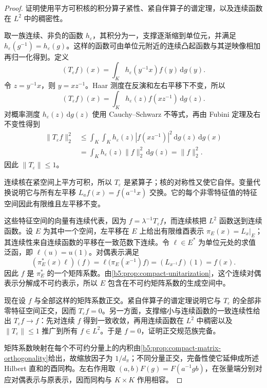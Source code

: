 \begin{proof}
	证明使用平方可积核的积分算子紧性、紧自伴算子的谱定理，以及连续函数在 \(L^2\) 中的稠密性。

	取一族连续、非负的函数 \(h_\varepsilon\)，其积分为一，支撑逐渐缩到单位元，并满足 \(h_\varepsilon(g^{-1})=h_\varepsilon(g)\)。这样的函数可由单位元附近的连续凸起函数与其逆映像相加再归一化得到。定义
	\[
		(T_\varepsilon f)(x)=\int_Kh_\varepsilon(y^{-1}x)f(y)\,\mathrm{d}g(y).
	\]
	令 \(z=y^{-1}x\)，则 \(y=xz^{-1}\)。Haar 测度在反演和左右平移下不变，所以
	\[
		(T_\varepsilon f)(x)=\int_Kh_\varepsilon(z)f(xz^{-1})\,\mathrm{d}g(z).
	\]
	对概率测度 \(h_\varepsilon(z)\,\mathrm{d}g(z)\) 使用 Cauchy--Schwarz 不等式，再由 Fubini 定理及右不变性得到
	\[
		\begin{aligned}
			\|T_\varepsilon f\|_2^2 &\le\int_K\int_Kh_\varepsilon(z)|f(xz^{-1})|^2\,\mathrm{d}g(z)\,\mathrm{d}g(x)\\
			&=\int_Kh_\varepsilon(z)\|f\|_2^2\,\mathrm{d}g(z)=\|f\|_2^2.
		\end{aligned}
	\]
	因此 \(\|T_\varepsilon\|\le1\)。

	连续核在紧空间上平方可积，所以 \(T_\varepsilon\) 是紧算子；核的对称性又使它自伴。变量代换说明它与所有左平移 \(L_af(x)=f(a^{-1}x)\) 交换。它的每个非零特征值的特征空间因此有限维且左平移不变。

	这些特征空间的向量有连续代表，因为 \(f=\lambda^{-1}T_\varepsilon f\)，而连续核把 \(L^2\) 函数送到连续函数。设 \(E\) 为其中一个空间，左平移在 \(E\) 上给出有限维酉表示 \(\pi_E(x)=L_x|_E\)；其连续性来自连续函数的平移在一致范数下连续。令 \(\ell\in E^*\) 为单位元处的求值泛函，即 \(\ell(u)=u(1)\)。对偶表示满足
	\[
		(\pi_E^*(x)\ell)(f) =\ell\bigl(\pi_E(x^{-1})f\bigr) =(L_{x^{-1}}f)(1)=f(x).
	\]
	因此 \(f\) 是 \(\pi_E^*\) 的一个矩阵系数。由\cref{b5:prop:compact-unitarization}，这个连续对偶表示分解成不可约表示，所以 \(E\) 包含在不可约矩阵系数的生成空间中。

	现在设 \(f\) 与全部这样的矩阵系数正交。紧自伴算子的谱定理说明它与 \(T_\varepsilon\) 的全部非零特征空间正交，因而 \(T_\varepsilon f=0\)。另一方面，支撑缩小与连续函数的一致连续性给出 \(T_\varepsilon f\to f\)：先对连续 \(f\) 得到一致收敛，再用连续函数在 \(L^2\) 中稠密以及 \(\|T_\varepsilon\|\le1\) 推广到所有 \(f\in L^2\)。于是 \(f=0\)，证明正交规范族完备。

	矩阵系数映射在每个不可约分量上的内积由\cref{b5:prop:compact-matrix-orthogonality}给出，故缩放因子为 \(1/d_\pi\)；不同分量正交，完备性使它延伸成所述 Hilbert 直和的酉同构。左右作用取 \((a,b)F(g)=F(a^{-1}gb)\)，在张量端分别对应对偶表示与原表示，因而同构与 \(K\times K\) 作用相容。
\end{proof}

